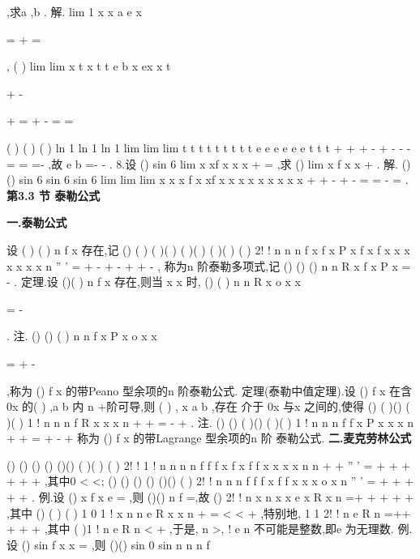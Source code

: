 ,求a ,b . 
解.
lim 1
x
x
a
e
x
\to \infty 


=
+
=




,
(
)
lim
lim
x
t
x
t
t
e
b
x
ex
x
t
\to \infty 
\to 


+
-


+
=
+
-
=
=










(
)
(
)
(
)
ln 1
ln 1
ln 1
lim
lim
lim
t
t
t
t
t
t
t
t
t
e
e
e
e
e
e
t
t
t
+
+
+
-
\to 
\to 
\to 
+
-
-
-
=
=
=-
,故
e
b =-
-
. 
8.设
()
sin 6
lim
x
xf
x
x
x
\to 
+
=
,求
()
lim
x
f x
x
\to 
+
. 
解.
()
()
sin 6
sin 6
sin 6
lim
lim
lim
x
x
x
f x
xf x
x
x
x
x
x
x
x
x
\to 
\to 
\to 
+
+
-
+
-
=
=
-
=
. 
\vspace{6pt}
{\large \bfseries \textcolor{lyred}{第3.3 节 泰勒公式}}

\vspace{4pt}
{\bfseries \textcolor{lyred}{一.泰勒公式}}

设
(
)
( )
n
f
x
存在,记 
()
(
)
(
)(
)
(
)(
)
(
)(
)
( )
2!
!
n
n
n
f
x
f
x
P
x
f
x
f
x
x
x
x
x
x
x
n
''
'
=
+
-
+
-
+
+
-
\Lambda 
, 
称为\textcolor{lyred}{n 阶泰勒多项式},记
()
()
()
n
n
R
x
f x
P x
=
-
. 
\textcolor{lyred}{定理}.设
()(
)
n
f
x
存在,则当
x
x
\to 
时,
()
(
)
n
n
R
x
o
x
x


=
-

. 
\textcolor{lyred}{注}.
()
()
(
)
n
n
f x
P x
o
x
x


=
+
-

,称为
()
f x 的带\textcolor{lyred}{Peano 型余项的n 阶泰勒公式}. 
\textcolor{lyred}{定理(泰勒中值定理)}.设
()
f x 在含
0x 的(
)
,a b 内
n +阶可导,则
(
)
,
x
a b
\forall \in 
,存在 
介于
0x 与x 之间的\psi ,使得
()
(
)()
(
)(
)
1 !
n
n
n
f
R
x
x
x
n
\psi 
+
+
=
-
+
. 
\textcolor{lyred}{注}.
()
()
(
)()
(
)(
)
1 !
n
n
n
f
f
x
P
x
x
x
n
\psi 
+
+
=
+
-
+
称为
()
f x 的带\textcolor{lyred}{Lagrange 型余项的n 阶} 
\textcolor{lyred}{泰勒公式}. 
\vspace{4pt}
{\bfseries \textcolor{lyred}{二.麦克劳林公式}}

()
()
()
()
()()
(
)(
)
(
)
2!
!
1 !
n
n
n
n
f
f
f
x
f x
f
f
x
x
x
x
n
n
\theta 
+
+
''
'
=
+
+
+
+
+
+
\Lambda 
,其中0
\theta 
<
<; 
()
()
()
()
()()
(
)
2!
!
n
n
n
f
f
f x
f
f
x
x
x
o x
n
''
'
=
+
+
+
+
+
\Lambda 
. 
\textcolor{lyred}{例}.设
()
x
f x
e
=
,则
()()
n
f
=,故
()
2!
!
n
x
n
x
x
e
x
R
x
n
=+
+
+
+
+
\Lambda 
,其中 
()
(
)
(
)
1 0
1 !
x
n
n
e
R
x
x
n
\theta 
\theta 
+
=
<
<
+
,特别地,
1 1
2!
!
n
e
R
n
=++
+
+
+
\Lambda 
,其中 
(
)1 !
n
e
R
n
<
+
,于是,
n
\forall >,
!
e n
\cdots 
不可能是整数,即e 为无理数. 
\textcolor{lyred}{例}.设
()
sin
f x
x
=
,则
()()
sin 0
sin
n
n
n
f
\pi 
\pi 


